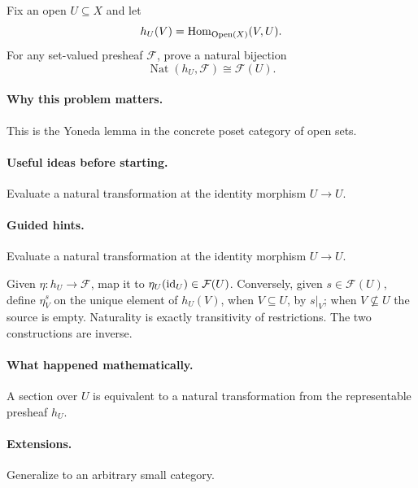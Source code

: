 \begin{problem}
Fix an open $U\subseteq X$ and let
\[
h_U(V)=\operatorname{Hom}_{\operatorname{Open}(X)}(V,U).
\]
For any set-valued presheaf $\mathcal F$, prove a natural bijection
\[
\operatorname{Nat}(h_U,\mathcal F)\cong\mathcal F(U).
\]
\end{problem}

\paragraph{Why this problem matters.}
This is the Yoneda lemma in the concrete poset category of open sets.

\paragraph{Useful ideas before starting.}
Evaluate a natural transformation at the identity morphism $U\to U$.

\paragraph{Guided hints.}
Evaluate a natural transformation at the identity morphism $U\to U$.

\begin{solution}
Given $\eta:h_U\to\mathcal F$, map it to $\eta_U(\operatorname{id}_U)\in\mathcal F(U)$.  Conversely, given $s\in\mathcal F(U)$, define $\eta^s_V$ on the unique element of $h_U(V)$, when $V\subseteq U$, by $s|_V$; when $V\not\subseteq U$ the source is empty.  Naturality is exactly transitivity of restrictions.  The two constructions are inverse.
\end{solution}

\paragraph{What happened mathematically.}
A section over $U$ is equivalent to a natural transformation from the representable presheaf $h_U$.

\paragraph{Extensions.}
Generalize to an arbitrary small category.
